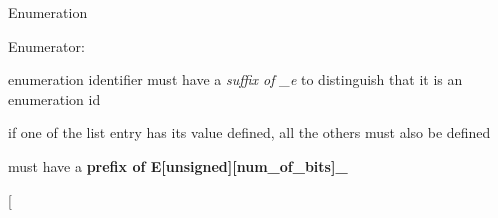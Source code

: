 Enumeration \begin{Desc}
\item[Enumerator\-: ]\par
\begin{description}
\item[{\em 
E\-U8\-\_\-\-S\-T\-A\-T\-E0\label{____lib__template_8c_aa507e06619a5bbe7d9df1c5b38ececc8adadac56a5b7d2248ca2cb34c907818c3}
}]
\begin{DoxyItemize}
\item enumeration identifier must have a {\itshape suffix of \-\_\-e} to distinguish that it is an enumeration id 
\end{DoxyItemize}\item[{\em 
E\-U8\-\_\-\-S\-T\-A\-T\-E1\label{____lib__template_8c_aa507e06619a5bbe7d9df1c5b38ececc8aa393ffba30c6dbe8327461216b18420b}
}]
\begin{DoxyItemize}
\item if one of the list entry has its value defined, all the others must also be defined 
\end{DoxyItemize}\item[{\em 
E\-U8\-\_\-\-S\-T\-A\-T\-E2\label{____lib__template_8c_aa507e06619a5bbe7d9df1c5b38ececc8abeaeb0357aa84a42748cfee3a189599e}
}]
\begin{DoxyItemize}
\item must have a {\bfseries prefix of E[unsigned][num\-\_\-of\-\_\-bits]\-\_\-} 
\end{DoxyItemize}\item[{\em 
}
\end{description}
\end{Desc}
